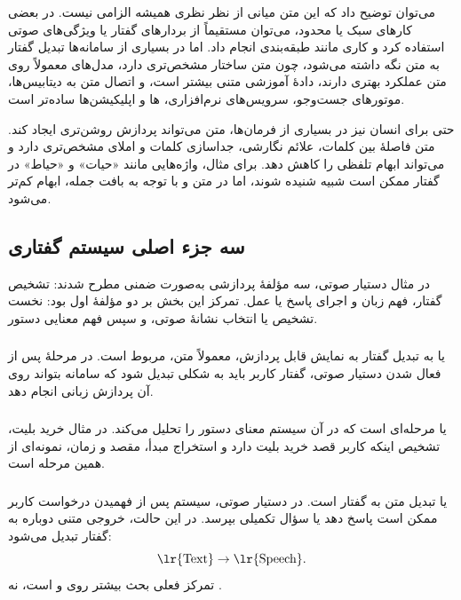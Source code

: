 می‌توان توضیح داد که این متن میانی از نظر نظری همیشه الزامی نیست. در بعضی کارهای سبک یا محدود، می‌توان مستقیماً از بردارهای گفتار یا ویژگی‌های صوتی استفاده کرد و کاری مانند طبقه‌بندی انجام داد. اما در بسیاری از سامانه‌ها تبدیل گفتار به متن نگه داشته می‌شود، چون متن ساختار مشخص‌تری دارد، مدل‌های  معمولاً روی متن عملکرد بهتری دارند، دادهٔ آموزشی متنی بیشتر است، و اتصال متن به دیتابیس‌ها، موتورهای جست‌وجو، سرویس‌های نرم‌افزاری، ها و اپلیکیشن‌ها ساده‌تر است.

حتی برای انسان نیز در بسیاری از فرمان‌ها، متن می‌تواند پردازش روشن‌تری ایجاد کند. متن فاصلهٔ بین کلمات، علائم نگارشی، جداسازی کلمات و املای مشخص‌تری دارد و می‌تواند ابهام تلفظی را کاهش دهد. برای مثال، واژه‌هایی مانند «حیات» و «حیاط» در گفتار ممکن است شبیه شنیده شوند، اما در متن و با توجه به بافت جمله، ابهام کم‌تر می‌شود.

\subsection{سه جزء اصلی سیستم گفتاری}
در مثال دستیار صوتی، سه مؤلفهٔ پردازشی به‌صورت ضمنی مطرح شدند: تشخیص گفتار، فهم زبان و اجرای پاسخ یا عمل. تمرکز این بخش بر دو مؤلفهٔ اول بود: نخست تشخیص یا انتخاب نشانهٔ صوتی، و سپس فهم معنایی دستور.

\subsubsection{}
 یا  به تبدیل گفتار به نمایش قابل پردازش، معمولاً متن، مربوط است. در مرحلهٔ پس از فعال شدن دستیار صوتی، گفتار کاربر باید به شکلی تبدیل شود که سامانه بتواند روی آن پردازش زبانی انجام دهد.

\subsubsection{}
 یا  مرحله‌ای است که در آن سیستم معنای دستور را تحلیل می‌کند. در مثال خرید بلیت، تشخیص اینکه کاربر قصد خرید بلیت دارد و استخراج مبدأ، مقصد و زمان، نمونه‌ای از همین مرحله است.

\subsubsection{}
 یا  تبدیل متن به گفتار است. در دستیار صوتی، سیستم پس از فهمیدن درخواست کاربر ممکن است پاسخ دهد یا سؤال تکمیلی بپرسد. در این حالت، خروجی متنی دوباره به گفتار تبدیل می‌شود:
\[
\text{\lr{Text}}\rightarrow \text{\lr{Speech}}.
\]
تمرکز فعلی بحث بیشتر روی  و  است، نه .

